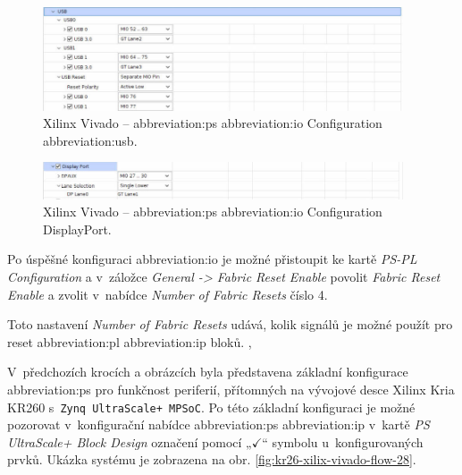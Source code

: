 \documentclass[a4paper, twoside, 11pt]{article}
\newcommand{\fbar}{\FloatBarrier}
\begin{document}
				\begin{figure}[htbp!]
					\centering
					\includegraphics[width=0.95\textwidth]{src/png/kr26-xilinx-vivado-flow/kr26-xilix-vivado-flow-25.jpg}
					\caption{Xilinx Vivado – \gls{abbreviation:ps} \gls{abbreviation:io} Configuration \gls{abbreviation:usb}.}
					\label{fig:kr26-xilix-vivado-flow-25}
				\end{figure}

				\begin{figure}[htbp!]
					\centering
					\includegraphics[width=0.95\textwidth]{src/png/kr26-xilinx-vivado-flow/kr26-xilix-vivado-flow-26.jpg}
					\caption{Xilinx Vivado – \gls{abbreviation:ps} \gls{abbreviation:io} Configuration DisplayPort.}
					\label{fig:kr26-xilix-vivado-flow-26}
				\end{figure}

				\fbar
				Po úspěšné konfiguraci \gls{abbreviation:io} je možné přistoupit ke kartě \textit{PS-PL Configuration} a v~záložce \textit{General -> Fabric Reset Enable} povolit \textit{Fabric Reset Enable} a zvolit v~nabídce \textit{Number of Fabric Resets} číslo 4.\par
				Toto nastavení \textit{Number of Fabric Resets} udává, kolik signálů je možné použít pro reset \gls{abbreviation:pl} \gls{abbreviation:ip} bloků. \cite{xilinx-ultra-scale-plus-mpsoc-processing-syste-product-guide}, \cite{xilinx-wiki-atlassian-zynq-ultra-scale-plus-mpsoc-restart-solution}\par

				V~předchozích krocích a obrázcích byla představena základní konfigurace \gls{abbreviation:ps} pro funkčnost periferií, přítomných na vývojové desce Xilinx Kria KR260 s~\texttt{Zynq UltraScale+ MPSoC}. Po této základní konfiguraci je možné pozorovat v~konfigurační nabídce \gls{abbreviation:ps} \gls{abbreviation:ip} v~kartě \textit{PS UltraScale+ Block Design} označení pomocí „$\checkmark$“ symbolu u~konfigurovaných prvků. Ukázka systému je zobrazena na obr. \ref{fig:kr26-xilix-vivado-flow-28}.
\end{document}
